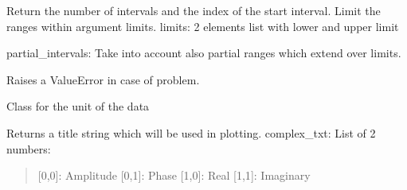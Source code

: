 \documentclass[letterpaper,10pt,english]{sphinxmanual}
\begin{document}
\begin{fulllineitems}
\begin{fulllineitems}
\end{fulllineitems}


\begin{fulllineitems}
\label{\detokenize{coordinate:flap.coordinate.Intervals.interval_number}}
Return the number of intervals and the index of the start interval.
Limit the ranges within argument limits.
limits: 2 elements list with lower and upper limit

partial\_intervals: Take into account also partial ranges which extend over limits.

Raises a ValueError in case of problem.

\end{fulllineitems}


\end{fulllineitems}


\begin{fulllineitems}
\label{\detokenize{coordinate:flap.coordinate.Unit}}
Class for the unit of the data

\begin{fulllineitems}
\label{\detokenize{coordinate:flap.coordinate.Unit.title}}
Returns a title string which will be used in plotting.
complex\_txt: List of 2 numbers:
\begin{quote}

{[}0,0{]}: Amplitude
{[}0,1{]}: Phase
{[}1,0{]}: Real
{[}1,1{]}: Imaginary
\end{quote}

\end{fulllineitems}


\end{fulllineitems}
\end{document}
